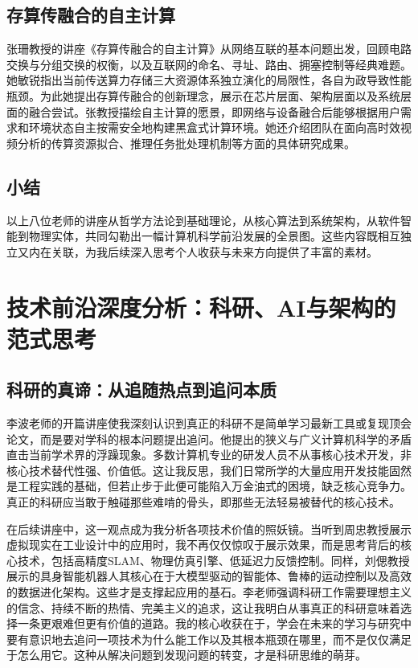 \documentclass[zihao=-4, linespread=1.5]{ctexart}
\begin{document}
\subsection{存算传融合的自主计算}

张珊教授的讲座《存算传融合的自主计算》从网络互联的基本问题出发，回顾电路交换与分组交换的权衡，以及互联网的命名、寻址、路由、拥塞控制等经典难题。她敏锐指出当前传送算力存储三大资源体系独立演化的局限性，各自为政导致性能瓶颈。为此她提出存算传融合的创新理念，展示在芯片层面、架构层面以及系统层面的融合尝试。张教授描绘自主计算的愿景，即网络与设备融合后能够根据用户需求和环境状态自主按需安全地构建黑盒式计算环境。她还介绍团队在面向高时效视频分析的传算资源拟合、推理任务批处理机制等方面的具体研究成果。

\subsection{小结}

以上八位老师的讲座从哲学方法论到基础理论，从核心算法到系统架构，从软件智能到物理实体，共同勾勒出一幅计算机科学前沿发展的全景图。这些内容既相互独立又内在关联，为我后续深入思考个人收获与未来方向提供了丰富的素材。

\section{技术前沿深度分析：科研、AI与架构的范式思考}

\subsection{科研的真谛：从追随热点到追问本质}

李波老师的开篇讲座使我深刻认识到真正的科研不是简单学习最新工具或复现顶会论文，而是要对学科的根本问题提出追问。他提出的狭义与广义计算机科学的矛盾直击当前学术界的浮躁现象。多数计算机专业的研发人员不从事核心技术开发，非核心技术替代性强、价值低。这让我反思，我们日常所学的大量应用开发技能固然是工程实践的基础，但若止步于此便可能陷入万金油式的困境，缺乏核心竞争力。真正的科研应当敢于触碰那些难啃的骨头，即那些无法轻易被替代的核心技术。

在后续讲座中，这一观点成为我分析各项技术价值的照妖镜。当听到周忠教授展示虚拟现实在工业设计中的应用时，我不再仅仅惊叹于展示效果，而是思考背后的核心技术，包括高精度SLAM、物理仿真引擎、低延迟力反馈控制。同样，刘偲教授展示的具身智能机器人其核心在于大模型驱动的智能体、鲁棒的运动控制以及高效的数据进化架构。这些才是支撑起应用的基石。李老师强调科研工作需要理想主义的信念、持续不断的热情、完美主义的追求，这让我明白从事真正的科研意味着选择一条更艰难但更有价值的道路。我的核心收获在于，学会在未来的学习与研究中要有意识地去追问一项技术为什么能工作以及其根本瓶颈在哪里，而不是仅仅满足于怎么用它。这种从解决问题到发现问题的转变，才是科研思维的萌芽。
\end{document}
